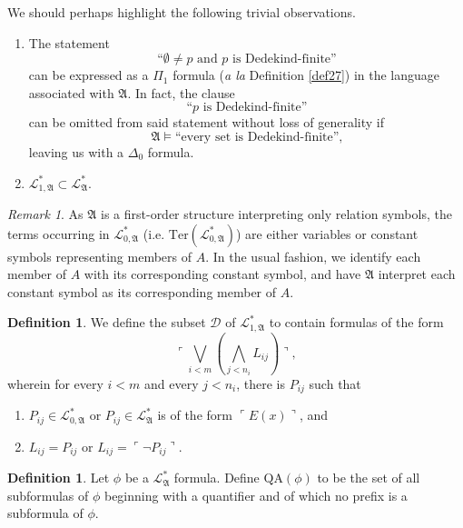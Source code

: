 \documentclass[12pt, twoside]{memoir}
\numberwithin{equation}{section}
\theoremstyle{definition}
\newtheorem{defi}[thm]{Definition}
\theoremstyle{remark}
\newtheorem{rem}[thm]{Remark}
\theoremstyle{definition}
\theoremstyle{definition}
\theoremstyle{definition}
\theoremstyle{remark}
\begin{document}
We should perhaps highlight the following trivial observations. 
\begin{enumerate}[label=(\Roman*)]
    \item\label{s31I} The statement $$\text{``}\emptyset \neq p \text{ and } p \text{ is Dedekind-finite''}$$ can be expressed as a $\Pi_1$ formula (\emph{a la} Definition \ref{def27}) in the language associated with $\mathfrak{A}$. In fact, the clause $$\text{``} p \text{ is Dedekind-finite''}$$ can be omitted from said statement without loss of generality if 
    \begin{equation*}
        \mathfrak{A} \models \text{``every set is Dedekind-finite'',}
    \end{equation*}
    leaving us with a $\Delta_0$ formula.
    \item $\mathcal{L}^{*}_{1, \mathfrak{A}} \subset \mathcal{L}^{*}_{\mathfrak{A}}$.
\end{enumerate}

\begin{rem}
As $\mathfrak{A}$ is a first-order structure interpreting only relation symbols, the terms occurring in $\mathcal{L}^{*}_{0, \mathfrak{A}}$ (i.e. $\mathrm{Ter}(\mathcal{L}^{*}_{0, \mathfrak{A}})$) are either variables or constant symbols representing members of $A$. In the usual fashion, we identify each member of $A$ with its corresponding constant symbol, and have $\mathfrak{A}$ interpret each constant symbol as its corresponding member of $A$.
\end{rem}

\begin{defi}
We define the subset $\mathcal{D}$ of $\mathcal{L}^{*}_{1, \mathfrak{A}}$ to contain formulas of the form $$\ulcorner \bigvee_{i < m} (\bigwedge_{j < n_i} L_{ij}) \urcorner,$$ wherein for every $i < m$ and every $j < n_i$, there is $P_{ij}$ such that
\begin{enumerate}[label=(\alph*)]
    \item $P_{ij} \in \mathcal{L}^{*}_{0, \mathfrak{A}}$ or $P_{ij} \in \mathcal{L}^{*}_{\mathfrak{A}}$ is of the form $\ulcorner E(x) \urcorner$, and 
    \item $L_{ij} = P_{ij}$ or $L_{ij} = \ulcorner \neg P_{ij} \urcorner$.
\end{enumerate}
\end{defi}

\begin{defi}
Let $\phi$ be a $\mathcal{L}^{*}_{\mathfrak{A}}$ formula. Define $\mathrm{QA}(\phi)$ to be the set of all subformulas of $\phi$ beginning with a quantifier and of which no prefix is a subformula of $\phi$.
\end{defi}
\end{document}
